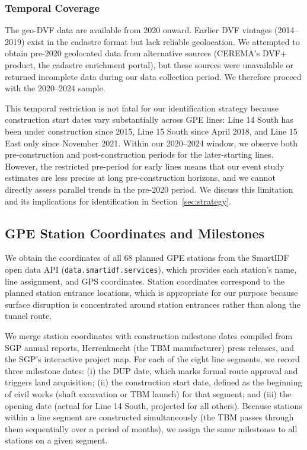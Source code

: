 \documentclass[12pt]{article}
\begin{document}
\subsubsection{Temporal Coverage}

The geo-DVF data are available from 2020 onward. Earlier DVF vintages (2014--2019) exist in the cadastre format but lack reliable geolocation. We attempted to obtain pre-2020 geolocated data from alternative sources (CEREMA's DVF+ product, the cadastre enrichment portal), but these sources were unavailable or returned incomplete data during our data collection period. We therefore proceed with the 2020--2024 sample.

This temporal restriction is not fatal for our identification strategy because construction start dates vary substantially across GPE lines: Line 14 South has been under construction since 2015, Line 15 South since April 2018, and Line 15 East only since November 2021. Within our 2020--2024 window, we observe both pre-construction and post-construction periods for the later-starting lines. However, the restricted pre-period for early lines means that our event study estimates are less precise at long pre-construction horizons, and we cannot directly assess parallel trends in the pre-2020 period. We discuss this limitation and its implications for identification in Section~\ref{sec:strategy}.

\subsection{GPE Station Coordinates and Milestones}

We obtain the coordinates of all 68 planned GPE stations from the SmartIDF open data API (\texttt{data.smartidf.services}), which provides each station's name, line assignment, and GPS coordinates. Station coordinates correspond to the planned station entrance locations, which is appropriate for our purpose because surface disruption is concentrated around station entrances rather than along the tunnel route.

We merge station coordinates with construction milestone dates compiled from SGP annual reports, Herrenknecht (the TBM manufacturer) press releases, and the SGP's interactive project map. For each of the eight line segments, we record three milestone dates: (i) the DUP date, which marks formal route approval and triggers land acquisition; (ii) the construction start date, defined as the beginning of civil works (shaft excavation or TBM launch) for that segment; and (iii) the opening date (actual for Line 14 South, projected for all others). Because stations within a line segment are constructed simultaneously (the TBM passes through them sequentially over a period of months), we assign the same milestones to all stations on a given segment.
\end{document}
